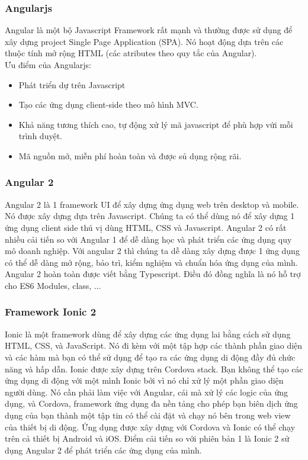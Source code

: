 \documentclass[a4paper,12pt,oneside]{article}
\begin{document}
\subsubsection{Angularjs}
\noindent Angular là một bộ Javascript Framework rất mạnh và thường được sử dụng để xây dựng project Single Page Application (SPA). Nó hoạt động dựa trên các thuộc tính mở rộng HTML (các atributes theo quy tắc của Angular).\\
Ưu điểm của Angularjs:
\begin{itemize}
\item Phát triển dự trên Javascript
\item Tạo các ứng dụng client-side theo mô hình MVC.
\item Khả năng tương thích cao, tự động xử lý mã javascript để phù hợp vứi mỗi trình duyệt.
\item Mã nguồn mở, miễn phí hoàn toàn và được sủ dụng rộng rãi.

\end{itemize}
\subsubsection{Angular 2}
\noindent Angular 2 là 1 framework UI để xây dựng ứng dụng web trên desktop và mobile. 
Nó được xây dựng dựa trên Javascript. Chúng ta có thể dùng nó để xây dựng 1 ứng dụng client side thú vị dùng HTML, CSS và Javascript. 
Angular 2 có rất nhiều cải tiến so với Angular 1 để dễ dàng học và phát triển các ứng dụng quy mô doanh nghiệp. 
Với angular 2 thì chúng ta dễ dàng xây dựng được 1 ứng dụng có thể dễ dàng mở rộng, bảo trì, kiểm nghiệm và chuẩn hóa ứng dụng của mình. 
Angular 2 hoàn toàn được viết bằng Typescript. Điều đó đồng nghĩa là nó hỗ trợ cho ES6 Modules, class, ...
\subsubsection{Framework Ionic 2}
\noindent Ionic là một framework dùng để xây dựng các ứng dụng lai bằng cách sử dụng HTML, CSS, và JavaScript. Nó đi kèm với một tập hợp các thành phần giao diện và các hàm mà bạn có thể sử dụng để tạo ra các ứng dụng di động đầy đủ chức năng và hấp dẫn. 
Ionic được xây dựng trên Cordova stack. Bạn không thể tạo các ứng dụng di động với một mình Ionic bởi vì nó chỉ xử lý một phần giao diện người dùng. Nó cần phải làm việc với Angular, cái mà xử lý các logic của ứng dụng, và Cordova, framework ứng dụng đa nền tảng cho phép bạn biên dịch ứng dụng của bạn thành một tập tin có thể cài đặt và chạy nó bên trong web view của thiết bị di động. 
Ứng dụng được xây dựng với Cordova và Ionic có thể chạy trên cả thiết bị Android và iOS.
Điểm cải tiến so với phiên bản 1 là Ionic 2 sử dụng Angular 2 để phát triển các ứng dụng của mình.
\end{document}
